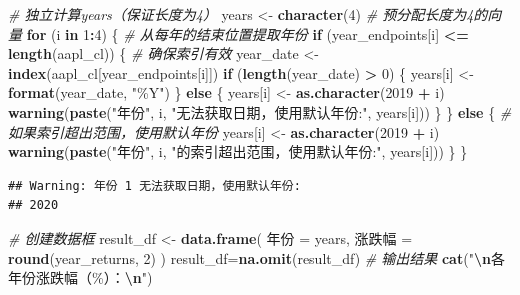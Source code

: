 \documentclass[]{ctexbook}
\newenvironment{Shaded}{\begin{snugshade}}{\end{snugshade}}
\newcommand{\CommentTok}[1]{\textcolor[rgb]{0.56,0.35,0.01}{\textit{#1}}}
\newcommand{\ControlFlowTok}[1]{\textcolor[rgb]{0.13,0.29,0.53}{\textbf{#1}}}
\newcommand{\DecValTok}[1]{\textcolor[rgb]{0.00,0.00,0.81}{#1}}
\newcommand{\FunctionTok}[1]{\textcolor[rgb]{0.13,0.29,0.53}{\textbf{#1}}}
\newcommand{\NormalTok}[1]{#1}
\newcommand{\OtherTok}[1]{\textcolor[rgb]{0.56,0.35,0.01}{#1}}
\newcommand{\SpecialCharTok}[1]{\textcolor[rgb]{0.81,0.36,0.00}{\textbf{#1}}}
\newcommand{\StringTok}[1]{\textcolor[rgb]{0.31,0.60,0.02}{#1}}
\begin{document}
\begin{Shaded}
\begin{Highlighting}[]
\CommentTok{\# 独立计算years（保证长度为4）}
\NormalTok{years }\OtherTok{\textless{}{-}} \FunctionTok{character}\NormalTok{(}\DecValTok{4}\NormalTok{)  }\CommentTok{\# 预分配长度为4的向量}
\ControlFlowTok{for}\NormalTok{ (i }\ControlFlowTok{in} \DecValTok{1}\SpecialCharTok{:}\DecValTok{4}\NormalTok{) \{}
  \CommentTok{\# 从每年的结束位置提取年份}
  \ControlFlowTok{if}\NormalTok{ (year\_endpoints[i] }\SpecialCharTok{\textless{}=} \FunctionTok{length}\NormalTok{(aapl\_cl)) \{}
    \CommentTok{\# 确保索引有效}
\NormalTok{    year\_date }\OtherTok{\textless{}{-}} \FunctionTok{index}\NormalTok{(aapl\_cl[year\_endpoints[i]])}
    \ControlFlowTok{if}\NormalTok{ (}\FunctionTok{length}\NormalTok{(year\_date) }\SpecialCharTok{\textgreater{}} \DecValTok{0}\NormalTok{) \{}
\NormalTok{      years[i] }\OtherTok{\textless{}{-}} \FunctionTok{format}\NormalTok{(year\_date, }\StringTok{"\%Y"}\NormalTok{)}
\NormalTok{    \} }\ControlFlowTok{else}\NormalTok{ \{}
\NormalTok{      years[i] }\OtherTok{\textless{}{-}} \FunctionTok{as.character}\NormalTok{(}\DecValTok{2019} \SpecialCharTok{+}\NormalTok{ i)}
      \FunctionTok{warning}\NormalTok{(}\FunctionTok{paste}\NormalTok{(}\StringTok{"年份"}\NormalTok{, i, }\StringTok{"无法获取日期，使用默认年份:"}\NormalTok{, years[i]))}
\NormalTok{    \}}
\NormalTok{  \} }\ControlFlowTok{else}\NormalTok{ \{}
    \CommentTok{\# 如果索引超出范围，使用默认年份}
\NormalTok{    years[i] }\OtherTok{\textless{}{-}} \FunctionTok{as.character}\NormalTok{(}\DecValTok{2019} \SpecialCharTok{+}\NormalTok{ i)}
    \FunctionTok{warning}\NormalTok{(}\FunctionTok{paste}\NormalTok{(}\StringTok{"年份"}\NormalTok{, i, }\StringTok{"的索引超出范围，使用默认年份:"}\NormalTok{, years[i]))}
\NormalTok{  \}}
\NormalTok{\}}
\end{Highlighting}
\end{Shaded}

\begin{verbatim}
## Warning: 年份 1 无法获取日期，使用默认年份:
## 2020
\end{verbatim}

\begin{Shaded}
\begin{Highlighting}[]
\CommentTok{\# 创建数据框}
\NormalTok{result\_df }\OtherTok{\textless{}{-}} \FunctionTok{data.frame}\NormalTok{(}
\NormalTok{  年份 }\OtherTok{=}\NormalTok{ years,}
\NormalTok{  涨跌幅 }\OtherTok{=} \FunctionTok{round}\NormalTok{(year\_returns, }\DecValTok{2}\NormalTok{)}
\NormalTok{)}
\NormalTok{result\_df}\OtherTok{=}\FunctionTok{na.omit}\NormalTok{(result\_df)}
\CommentTok{\# 输出结果}
\FunctionTok{cat}\NormalTok{(}\StringTok{"}\SpecialCharTok{\textbackslash{}n}\StringTok{各年份涨跌幅（\%）：}\SpecialCharTok{\textbackslash{}n}\StringTok{"}\NormalTok{)}
\end{Highlighting}
\end{Shaded}
\end{document}
